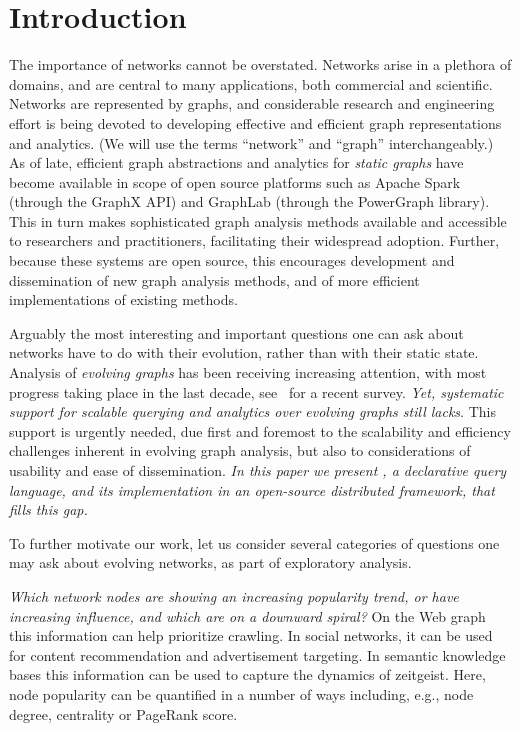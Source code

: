 \section{Introduction}
\label{sec:intro}

The importance of networks cannot be overstated. Networks arise in a
plethora of domains, and are central to many applications, both
commercial and scientific.  Networks are represented by graphs, and
considerable research and engineering effort is being devoted to
developing effective and efficient graph representations and
analytics. (We will use the terms ``network'' and ``graph''
interchangeably.) As of late, efficient graph abstractions and
analytics for {\em static graphs} have become available in scope of
open source platforms such as Apache Spark (through the GraphX API)
and GraphLab (through the PowerGraph library).  This in turn makes
sophisticated graph analysis methods available and accessible to
researchers and practitioners, facilitating their widespread adoption.
Further, because these systems are open source, this encourages
development and dissemination of new graph analysis methods, and of
more efficient implementations of existing methods.

Arguably the most interesting and important questions one can ask
about networks have to do with their evolution, rather than with their
static state.  Analysis of {\em evolving graphs} has been receiving
increasing attention, with most progress taking place in the last
decade, see~\cite{DBLP:journals/csur/AggarwalS14} for a recent survey.
{\em Yet, systematic support for scalable querying and analytics over
  evolving graphs still lacks}.  This support is urgently needed, due
first and foremost to the scalability and efficiency challenges
inherent in evolving graph analysis, but also to considerations of
usability and ease of dissemination. {\em In this paper we present
  \ql, a declarative query language, and its implementation in an
  open-source distributed framework, that fills this gap.}

To further motivate our work, let us consider several categories of
questions one may ask about evolving networks, as part of exploratory
analysis.

{\em Which network nodes are showing an increasing popularity trend,
  or have increasing influence, and which are on a downward spiral?}
On the Web graph this information can help prioritize crawling.  In
social networks, it can be used for content recommendation and
advertisement targeting.  In semantic knowledge bases this information
can be used to capture the dynamics of zeitgeist.  Here, node
popularity can be quantified in a number of ways including, e.g., node
degree, centrality or PageRank score.

